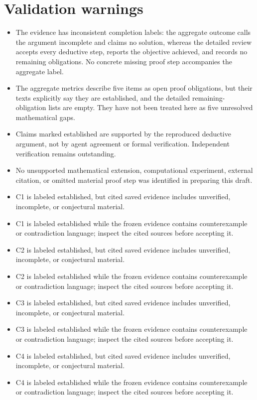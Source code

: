 \documentclass[11pt]{article}
\begin{document}
\section*{Validation warnings}
\begin{itemize}
\item The evidence has inconsistent completion labels: the aggregate outcome calls the argument incomplete and claims no solution, whereas the detailed review accepts every deductive step, reports the objective achieved, and records no remaining obligations. No concrete missing proof step accompanies the aggregate label.
\item The aggregate metrics describe five items as open proof obligations, but their texts explicitly say they are established, and the detailed remaining-obligation lists are empty. They have not been treated here as five unresolved mathematical gaps.
\item Claims marked established are supported by the reproduced deductive argument, not by agent agreement or formal verification. Independent verification remains outstanding.
\item No unsupported mathematical extension, computational experiment, external citation, or omitted material proof step was identified in preparing this draft.
\item C1 is labeled established, but cited saved evidence includes unverified, incomplete, or conjectural material.
\item C1 is labeled established while the frozen evidence contains counterexample or contradiction language; inspect the cited sources before accepting it.
\item C2 is labeled established, but cited saved evidence includes unverified, incomplete, or conjectural material.
\item C2 is labeled established while the frozen evidence contains counterexample or contradiction language; inspect the cited sources before accepting it.
\item C3 is labeled established, but cited saved evidence includes unverified, incomplete, or conjectural material.
\item C3 is labeled established while the frozen evidence contains counterexample or contradiction language; inspect the cited sources before accepting it.
\item C4 is labeled established, but cited saved evidence includes unverified, incomplete, or conjectural material.
\item C4 is labeled established while the frozen evidence contains counterexample or contradiction language; inspect the cited sources before accepting it.

\end{itemize}
\end{document}
